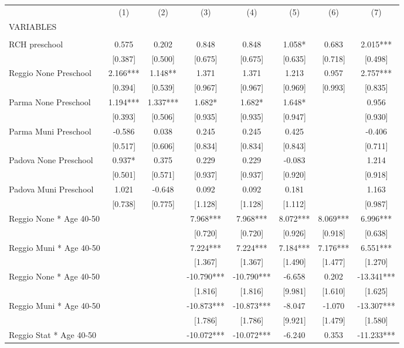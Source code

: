 \begin{tabular}{lccccccc} \hline
 & (1) & (2) & (3) & (4) & (5) & (6) & (7) \\
VARIABLES &  &  &  &  &  &  &  \\ \hline
 &  &  &  &  &  &  &  \\
RCH preschool & 0.575 & 0.202 & 0.848 & 0.848 & 1.058* & 0.683 & 2.015*** \\
 & [0.387] & [0.500] & [0.675] & [0.675] & [0.635] & [0.718] & [0.498] \\
Reggio None Preschool & 2.166*** & 1.148** & 1.371 & 1.371 & 1.213 & 0.957 & 2.757*** \\
 & [0.394] & [0.539] & [0.967] & [0.967] & [0.969] & [0.993] & [0.835] \\
Parma None Preschool & 1.194*** & 1.337*** & 1.682* & 1.682* & 1.648* &  & 0.956 \\
 & [0.393] & [0.506] & [0.935] & [0.935] & [0.947] &  & [0.930] \\
Parma Muni Preschool & -0.586 & 0.038 & 0.245 & 0.245 & 0.425 &  & -0.406 \\
 & [0.517] & [0.606] & [0.834] & [0.834] & [0.843] &  & [0.711] \\
Padova None Preschool & 0.937* & 0.375 & 0.229 & 0.229 & -0.083 &  & 1.214 \\
 & [0.501] & [0.571] & [0.937] & [0.937] & [0.920] &  & [0.918] \\
Padova Muni Preschool & 1.021 & -0.648 & 0.092 & 0.092 & 0.181 &  & 1.163 \\
 & [0.738] & [0.775] & [1.128] & [1.128] & [1.112] &  & [0.987] \\
Reggio None * Age 40-50 &  &  & 7.968*** & 7.968*** & 8.072*** & 8.069*** & 6.996*** \\
 &  &  & [0.720] & [0.720] & [0.926] & [0.918] & [0.638] \\
Reggio Muni * Age 40-50 &  &  & 7.224*** & 7.224*** & 7.184*** & 7.176*** & 6.551*** \\
 &  &  & [1.367] & [1.367] & [1.490] & [1.477] & [1.270] \\
Reggio None * Age 40-50 &  &  & -10.790*** & -10.790*** & -6.658 & 0.202 & -13.341*** \\
 &  &  & [1.816] & [1.816] & [9.981] & [1.610] & [1.625] \\
Reggio Muni * Age 40-50 &  &  & -10.873*** & -10.873*** & -8.047 & -1.070 & -13.307*** \\
 &  &  & [1.786] & [1.786] & [9.921] & [1.479] & [1.580] \\
Reggio Stat * Age 40-50 &  &  & -10.072*** & -10.072*** & -6.240 & 0.353 & -11.233*** \\

\end{tabular}
